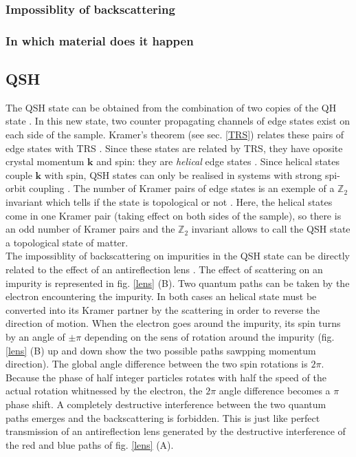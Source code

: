 


\subsubsection{Impossiblity of backscattering}

\subsubsection{In which material does it happen}


\subsection{QSH}

The QSH state can be obtained from the combination of two copies of the QH state \cite{buhmann_quantum_2011}. In this new state, two counter propagating channels of edge states exist on each side of the sample. Kramer's theorem (see sec. \ref{TRS}) relates these pairs of edge states with TRS \cite{buhmann_quantum_2011}. Since these states are related by TRS, they have oposite crystal momentum $\mathbf{k}$ and spin: they are \textit{helical} edge states \cite{bernevig_topological_2013}. Since helical states couple $\mathbf{k}$ with spin, QSH states can only be realised in systems with strong spi-orbit coupling \cite{qi_quantum_2010}. The number of Kramer pairs of edge states is an exemple of a $\mathbb{Z}_2$ invariant which tells if the state is topological or not \cite{koenig_quantum_2008}. Here, the helical states come in one Kramer pair (taking effect on both sides of the sample), so there is an odd number of Kramer pairs and the $\mathbb{Z}_2$ invariant allows to call the QSH state a topological state of matter.\\

The impossiblity of backscattering on impurities in the QSH state can be directly related to the effect of an antireflection lens \cite{qi_quantum_2010}. The effect of scattering on an impurity is represented in fig. \ref{lens} (B). Two quantum paths can be taken by the electron encountering the impurity. In both cases an helical state must be converted into its Kramer partner by the scattering in order to reverse the direction of motion. When the electron goes around the impurity, its spin turns by an angle of $\pm \pi$ depending on the sens of rotation around the impurity (fig. \ref{lens} (B) up and down show the two possible paths sawpping momentum direction). The global angle difference between the two spin rotations is $2\pi$. Because the phase of half integer particles rotates with half the speed of the actual rotation whitnessed by the electron, the $2\pi$ angle difference becomes a $\pi$ phase shift. A completely destructive interference between the two quantum paths emerges \cite{barut_path_1992} and the backscattering is forbidden. This is just like perfect transmission of an antireflection lens generated by the destructive interference of the red and blue paths of fig. \ref{lens} (A). 

